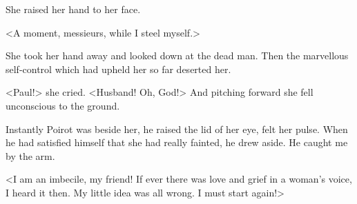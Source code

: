  She raised her hand to her face. 

 <A moment, messieurs, while I steel myself.> 

 She took her hand away and looked down at the dead man. Then the marvellous self-control which had upheld her so far deserted her. 

 <Paul!> she cried. <Husband! Oh, God!> And pitching forward she fell unconscious to the ground. 

 Instantly Poirot was beside her, he raised the lid of her eye, felt her pulse. When he had satisfied himself that she had really fainted, he drew aside. He caught me by the arm. 

 <I am an imbecile, my friend! If ever there was love and grief in a woman's voice, I heard it then. My little idea was all wrong.  I must start again!>